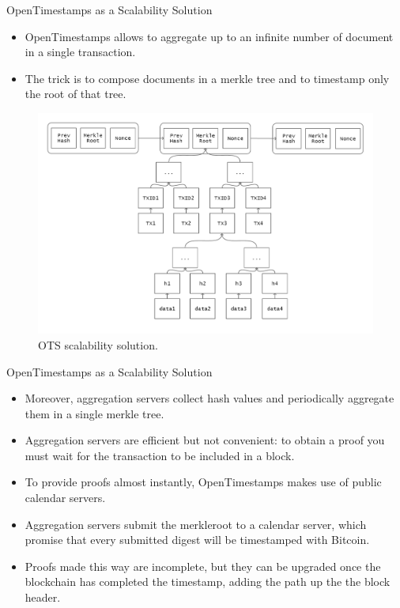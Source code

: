 \documentclass[usenames,dvipsnames]{beamer}
\begin{document}
    \begin{frame}{OpenTimestamps as a Scalability Solution}
        \begin{itemize}
            \item OpenTimestamps allows to \alert{aggregate} up to an \alert{infinite number} of document in a single transaction.
            \item The trick is to compose documents in a \alert{merkle tree} and to timestamp only the \alert{root} of that tree.
        \end{itemize}
        \begin{figure}
        \centering
        \includegraphics[width=0.6\linewidth]{Images/bitcoin-chain-calendar.png}
        \caption{OTS scalability solution.}
        \end{figure}
    \end{frame}
    
    \begin{frame}{OpenTimestamps as a Scalability Solution}
        \begin{itemize}
            \item Moreover, \alert{aggregation servers} collect hash values and periodically \alert{aggregate} them in a single merkle tree.
            \item Aggregation servers are \alert{efficient} but \alert{not convenient}: to obtain a proof you must wait for the transaction to be included in a block.
            \item To provide proofs almost \alert{instantly}, OpenTimestamps makes use of \alert{public calendar servers}.
            \item Aggregation servers submit the merkleroot to a calendar server, which \alert{promise} that every submitted digest will be timestamped with Bitcoin.
            \item Proofs made this way are \alert{incomplete}, but they can be \alert{upgraded} once the blockchain has completed the timestamp, \alert{adding} the path up the the \alert{block header}.
        \end{itemize}
    \end{frame}
    
\end{document}
